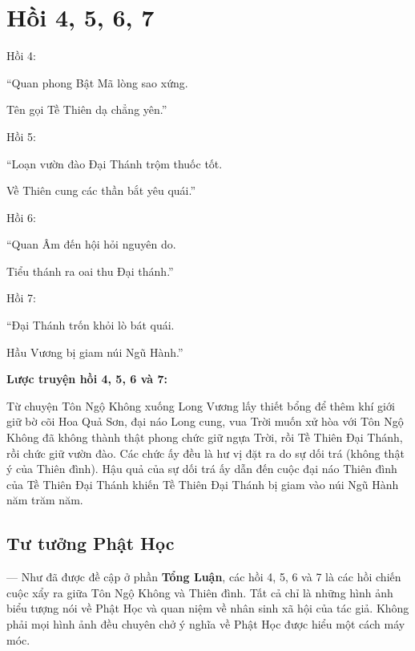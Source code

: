 \chapter{Hồi 4, 5, 6, 7} %
\label{cha:hoi_4_5_6_7}

Hồi 4:

\begin{itshape}
``Quan phong Bật Mã lòng sao xứng.

Tên gọi Tề Thiên dạ chẳng yên.''
\end{itshape}

Hồi 5:

\begin{itshape}
``Loạn vườn đào Đại Thánh trộm thuốc tốt.

Về Thiên cung các thần bắt yêu quái.''
\end{itshape}

Hồi 6:

\begin{itshape}
``Quan Âm đến hội hỏi nguyên do.

Tiểu thánh ra oai thu Đại thánh.''
\end{itshape}

Hồi 7:

\begin{itshape}
``Đại Thánh trốn khỏi lò bát quái.

Hầu Vương bị giam núi Ngũ Hành.''
\end{itshape}

{\bf Lược truyện hồi 4, 5, 6 và 7:}

Từ chuyện Tôn Ngộ Không xuống Long Vương lấy thiết bổng để thêm khí giới giữ bờ cõi Hoa Quả Sơn, đại náo Long cung, vua Trời muốn xử hòa với Tôn Ngộ Không đã không thành thật phong chức giữ ngựa Trời, rồi Tề Thiên Đại Thánh, rồi chức giữ vườn đào. Các chức ấy đều là hư vị đặt ra do sự dối trá (không thật ý của Thiên đình). Hậu quả của sự dối trá ấy dẫn đến cuộc đại náo Thiên đình của Tề Thiên Đại Thánh khiến Tề Thiên Đại Thánh bị giam vào núi Ngũ Hành năm trăm năm.

\section{Tư tưởng Phật Học} %
\label{sec:4_phat_hoc}

--- Như đã được đề cập ở phần {\bf Tổng Luận}, các hồi 4, 5, 6 và 7 là các hồi chiến cuộc xẩy ra giữa Tôn Ngộ Không và Thiên đình. Tất cả chỉ là những hình ảnh biểu tượng nói về Phật Học và quan niệm về nhân sinh xã hội của tác giả. Không phải mọi hình ảnh đều chuyên chở ý nghĩa về Phật Học được hiểu một cách máy móc.

